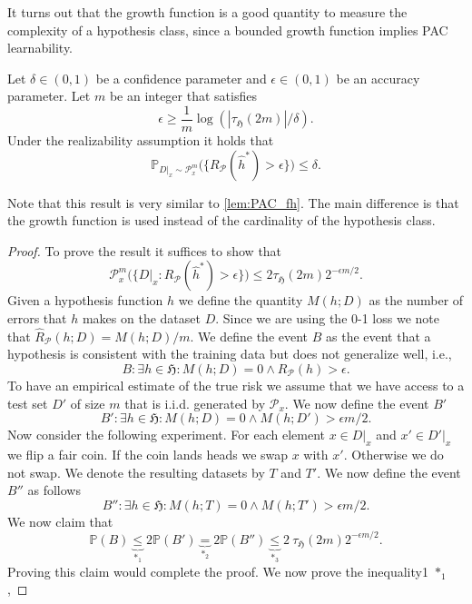 	It turns out that the growth function is a good quantity to measure the
	complexity of a hypothesis class, since a bounded growth function implies
	PAC learnability.
	\begin{thm}
		\label{thm:PAC_gf}
		Let $\delta \in (0,1)$ be a confidence parameter and $\epsilon \in
		(0,1)$ be an accuracy parameter. Let $m$ be an integer that satisfies
		$$
		\epsilon \geq  \frac{1}{m}\log(|\tau_\mathfrak{H}(2m)|/\delta).
		$$ 	
		Under the realizability assumption it holds that 
		$$
		\mathbb{P}_{D|_x \sim \mathcal{P}^m_x} \bigl( \{ R_\mathcal{P}(\hat{h}^*) > \epsilon \}\bigr) \leq \delta.
		$$
	\end{thm}	 
	Note that this result is very similar to \autoref{lem:PAC_fh}. The main difference is that the growth function is used instead of the cardinality of the hypothesis class.
	\begin{proof}
		To prove the result it suffices to show that 
		$$
		\mathcal{P}^m_x\bigl(\{D|_x: R_\mathcal{P}(\hat{h}^*) > \epsilon\} \bigr) \leq 2 \tau_\mathfrak{H}(2m) 2^{-\epsilon m/2}.
		$$
		Given a hypothesis function $h$ we define the quantity $M(h;D)$ as the
		number of errors that $h$ makes on the dataset $D$. Since we are using
		the 0-1 loss we note that $\hat{R}_\mathcal{P}(h;D) = M(h;D)/m$. 
	We define the event $B$ as the event that a hypothesis
	 is consistent with the training data but does not generalize well, i.e., 
$$
B : \exists h \in \mathfrak{H}: M(h;D) = 0 \wedge R_\mathcal{P}(h) > \epsilon.
$$
To have an empirical estimate of the true risk we assume that we have access to
a test set $D'$ of size $m$ that is i.i.d. generated by $\mathcal{P}_x$. We now
define the event $B'$
$$ 
B' : \exists h \in \mathfrak{H}: M(h;D) = 0 \wedge M(h;D') > \epsilon m/2.
$$
Now consider the following experiment. For each element $x \in D|_x$ and $x' \in
D'|_x$ we flip a fair coin. If the coin lands heads we swap $x$ with $x'$.
Otherwise we do not swap. We denote the resulting datasets by $T$ and $T'$. We
now define the event $B''$ as follows
$$ 
B'' : \exists h \in \mathfrak{H}: M(h;T) = 0 \wedge M(h;T') > \epsilon m/2.
$$
We now claim that
$$
\mathbb{P}(B) \underbrace{\leq}_{*_1} 2 \mathbb{P}(B') \underbrace{=}_{*_2} 2 \mathbb{P}(B'') \underbrace{\leq}_{*_3} 2 \ \tau_\mathfrak{H}(2m) 2^{-\epsilon m/2}.
$$
Proving this claim would complete the proof. We now prove the inequality1
$*_1$,


\end{proof}
